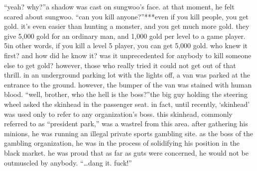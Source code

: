 “yeah? why?”a shadow was cast on sungwoo’s face.
 at that moment, he felt scared about sungwoo.
“can you kill anyone?”***even if you kill people, you get gold.
it’s even easier than hunting a monster, and you get much more gold.
they give 5,000 gold for an ordinary man, and 1,000 gold per level to a game player.
5in other words, if you kill a level 5 player, you can get 5,000 gold.
who knew it first? and how did he know it? was it unprecedented for anybody to kill someone else to get gold? however, those who really tried it could not get out of that thrill.
in an underground parking lot with the lights off, a van was parked at the entrance to the ground.
 however, the bumper of the van was stained with human blood.
“well, brother, who the hell is the boss?”the big guy holding the steering wheel asked the skinhead in the passenger seat.
in fact, until recently, ‘skinhead’ was used only to refer to any organization’s boss.
this skinhead, commonly referred to as “president park,” was a wastrel from this area.
 after gathering his minions, he was running an illegal private sports gambling site.
as the boss of the gambling organization, he was in the process of solidifying his position in the black market.
 he was proud that as far as guts were concerned, he would not be outmuscled by anybody.
“…dang it.
 fuck!”

 